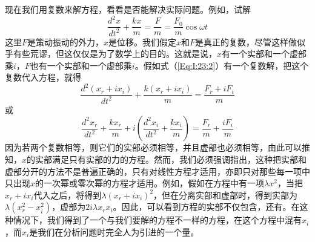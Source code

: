 现在我们用复数来解方程，看看是否能解决实际问题。例如，试解
\begin{equation}
    \label{Eq:I:23:2}
    \frac{d^2x}{dt^2} + \frac{kx}{m} = \frac{F}{m} = \frac{F_0}{m}\cos\omega t
\end{equation}
这里$F$是策动振动的外力，$x$是位移。我们假定$x$和$F$是真正的复数，尽管这样做似乎有些荒谬，但这仅仅是为了数学上的目的。这就是说，$x$有一个实部和一个虚部乘$i$，$F$也有一个实部和一个虚部乘$i$。假如式（\ref{Eq:I:23:2}）有一个复数解，把这个复数代入方程，就得
\begin{equation*}
    \frac{d^2(x_r+ix_i)}{dt^2} + \frac{k(x_r + ix_i)}{m} = \frac{F_r + iF_i}{m}
\end{equation*}
或
\begin{equation*}
    \frac{d^2x_r}{dt^2} + \frac{kx_r}{m} + i(\frac{d^2x_i}{dt^2} + \frac{kx_i}{m}) = \frac{F_r}{m} + \frac{iF_i}{m}
\end{equation*}
因为若两个复数相等，则它们的实部必须相等，并且虚部也必须相等，由此可以推知，$x$的实部满足只有实部的力的方程。然而，我们必须强调指出，这种把实部和虚部分开的方法不是普遍正确的，只有对线性方程才适用，亦即只对那些每一项中只出现$x$的一次幂或零次幂的方程才适用。例如，假如在方程中有一项$\lambda x^2$，当把$x_r+ix_i$代入之后，将得到$\lambda(x_r+ix_i)^2$，但在分离实部和虚部时，得到实部为$\lambda (x_r^2 - x_i^2)$，虚部为$2i\lambda x_rx_i$。因此，可以看到方程的实部不仅包含，还有。在这种情况下，我们得到了一个与我们要解的方程不一样的方程，在这个方程中混有$x_i$，而$x_i$是我们在分析问题时完全人为引进的一个量。

